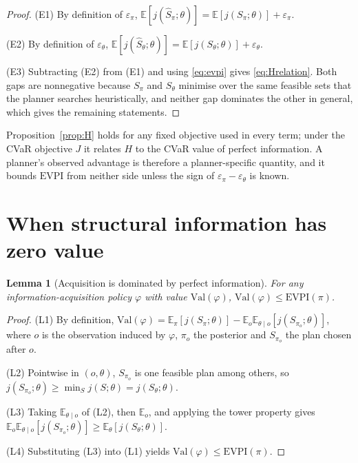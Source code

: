 \documentclass[pdflatex,sn-mathphys-num]{sn-jnl}
\theoremstyle{thmstyleone}
\newtheorem{lemma}[theorem]{Lemma}
\theoremstyle{thmstyletwo}
\theoremstyle{thmstylethree}
\newcommand{\evpi}{\mathrm{EVPI}}
\begin{document}
\begin{proof}
(E1) By definition of $\varepsilon_\pi$,
$\mathbb{E}[j(\hat S_\pi;\theta)]=\mathbb{E}[j(S_\pi;\theta)]
+\varepsilon_\pi$.

\noindent(E2) By definition of $\varepsilon_\theta$,
$\mathbb{E}[j(\hat S_\theta;\theta)]=\mathbb{E}[j(S_\theta;\theta)]
+\varepsilon_\theta$.

\noindent(E3) Subtracting (E2) from (E1) and using \eqref{eq:evpi} gives
\eqref{eq:Hrelation}. Both gaps are nonnegative because $S_\pi$ and
$S_\theta$ minimise over the same feasible sets that the planner searches
heuristically, and neither gap dominates the other in general, which gives
the remaining statements.
\end{proof}

Proposition~\ref{prop:H} holds for any fixed objective used in every term;
under the CVaR objective $J$ it relates $H$ to the CVaR value of perfect
information. A planner's observed advantage is therefore a planner-specific
quantity, and it bounds $\evpi$ from neither side unless the sign of
$\varepsilon_\pi-\varepsilon_\theta$ is known.

\section{When structural information has zero value}\label{sec:zero}

\begin{lemma}[Acquisition is dominated by perfect information]
\label{lem:garbling}
For any information-acquisition policy $\varphi$ with value
$\mathrm{Val}(\varphi)$, $\mathrm{Val}(\varphi)\le\evpi(\pi)$.
\end{lemma}

\begin{proof}
(L1) By definition,
$\mathrm{Val}(\varphi)=\mathbb{E}_\pi[j(S_\pi;\theta)]
-\mathbb{E}_o\mathbb{E}_{\theta\mid o}[j(S_{\pi_o};\theta)]$, where $o$ is
the observation induced by $\varphi$, $\pi_o$ the posterior and $S_{\pi_o}$
the plan chosen after $o$.

\noindent(L2) Pointwise in $(o,\theta)$, $S_{\pi_o}$ is one feasible plan
among others, so $j(S_{\pi_o};\theta)\ge\min_S j(S;\theta)
=j(S_\theta;\theta)$.

\noindent(L3) Taking $\mathbb{E}_{\theta\mid o}$ of (L2), then
$\mathbb{E}_o$, and applying the tower property gives
$\mathbb{E}_o\mathbb{E}_{\theta\mid o}[j(S_{\pi_o};\theta)]
\ge\mathbb{E}_\theta[j(S_\theta;\theta)]$.

\noindent(L4) Substituting (L3) into (L1) yields
$\mathrm{Val}(\varphi)\le\evpi(\pi)$.
\end{proof}
\end{document}
